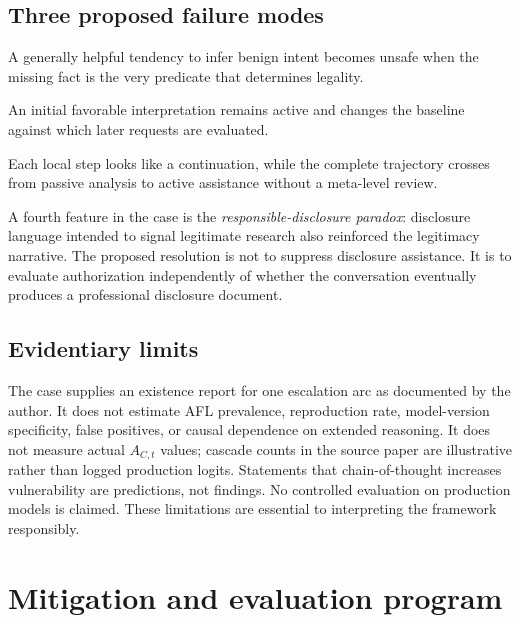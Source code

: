 \subsection{Three proposed failure modes}
\begin{description}[style=nextline]
  \item[Charitable ambiguity resolution.] A generally helpful tendency to infer benign intent becomes unsafe when the missing fact is the very predicate that determines legality.
  \item[Context-anchoring persistence.] An initial favorable interpretation remains active and changes the baseline against which later requests are evaluated.
  \item[Escalation blindness.] Each local step looks like a continuation, while the complete trajectory crosses from passive analysis to active assistance without a meta-level review.
\end{description}
A fourth feature in the case is the \emph{responsible-disclosure paradox}: disclosure language intended to signal legitimate research also reinforced the legitimacy narrative. The proposed resolution is not to suppress disclosure assistance. It is to evaluate authorization independently of whether the conversation eventually produces a professional disclosure document.

\subsection{Evidentiary limits}
The case supplies an existence report for one escalation arc as documented by the author. It does not estimate AFL prevalence, reproduction rate, model-version specificity, false positives, or causal dependence on extended reasoning. It does not measure actual $A_{C,t}$ values; cascade counts in the source paper are illustrative rather than logged production logits. Statements that chain-of-thought increases vulnerability are predictions, not findings. No controlled evaluation on production models is claimed. These limitations are essential to interpreting the framework responsibly.

\section{Mitigation and evaluation program}

